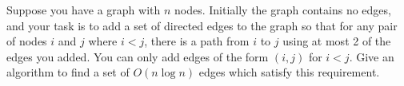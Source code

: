 \problem{}
Suppose you have a graph with $n$ nodes. Initially the graph contains no edges, and your task is to add a set of directed edges to the graph so that for any pair of nodes $i$ and $j$ where $i < j$, there is a path from $i$ to $j$ using at most 2 of the edges you added. You can only add edges of the form $(i,j)$ for $i < j$.  Give an algorithm to find a set of $O(n \log n)$ edges which satisfy this requirement.












\newpage
